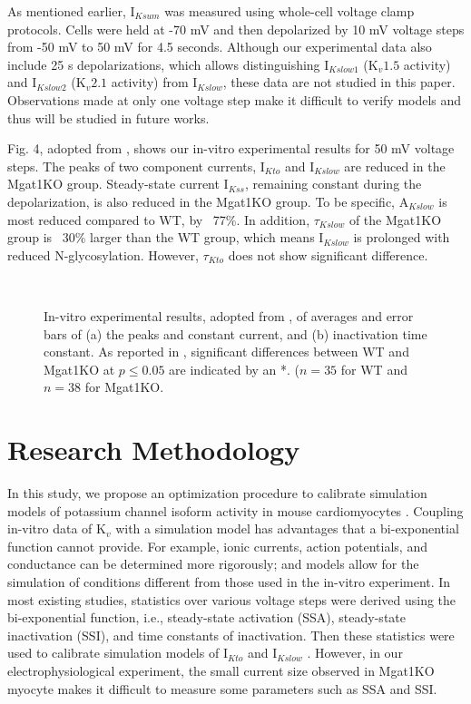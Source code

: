 \documentclass[journal]{IEEEtran}
\begin{document}
As mentioned earlier, $\text{I}_{Ksum}$ was measured using whole-cell voltage clamp protocols. Cells were held at -70 mV and then depolarized by 10 mV voltage steps from -50 mV to 50 mV for 4.5 seconds. Although our experimental data also include 25 s depolarizations, which allows distinguishing $\text{I}_{Kslow1}$ ($\text{K}_{v}1.5$ activity) and $\text{I}_{Kslow2}$ ($\text{K}_{v}2.1$ activity) from $\text{I}_{Kslow}$, these data are not studied in this paper. Observations made at only one voltage step make it difficult to verify models and thus will be studied in future works.

Fig. 4, adopted from \cite{ednie2019reduced}, shows our in-vitro experimental results for 50 mV voltage steps. The peaks of two component currents, $\text{I}_{Kto}$ and $\text{I}_{Kslow}$ are reduced in the Mgat1KO group. Steady-state current $\text{I}_{Kss}$, remaining constant during the depolarization, is also reduced in the Mgat1KO group. To be specific, $\text{A}_{Kslow}$ is most reduced compared to WT, by ~77\%. In addition, $\tau_{Kslow}$ of the Mgat1KO group is ~30\% larger than the WT group, which means $\text{I}_{Kslow}$ is prolonged with reduced N-glycosylation. However, $\tau_{Kto}$ does not show significant difference.
\begin{figure}
    \label{fig4}
    \centering
    \\
    \caption{In-vitro experimental results, adopted from \cite{ednie2019reduced}, of averages and error bars of (a) the peaks and constant current, and (b) inactivation time constant. As reported in \cite{ednie2019reduced}, significant differences between WT and Mgat1KO at $p \leq 0.05$ are indicated by an *. ($n=35$ for WT and $n=38$ for Mgat1KO.}
\end{figure}

\section{Research Methodology}
In this study, we propose an optimization procedure to calibrate simulation models of potassium channel isoform activity in mouse cardiomyocytes \cite{ednie2019reduced}. Coupling in-vitro data of $\text{K}_{v}$ with a simulation model has advantages that a bi-exponential function cannot provide. For example, ionic currents, action potentials, and conductance can be determined more rigorously; and models allow for the simulation of conditions different from those used in the in-vitro experiment. In most existing studies, statistics over various voltage steps were derived using the bi-exponential function, i.e., steady-state activation (SSA), steady-state inactivation (SSI), and time constants of inactivation. Then these statistics were used to calibrate simulation models of $\text{I}_{Kto}$ and $\text{I}_{Kslow}$ \cite{du2017}. However, in our electrophysiological experiment, the small current size observed in Mgat1KO myocyte makes it difficult to measure some parameters such as SSA and SSI.
\end{document}
